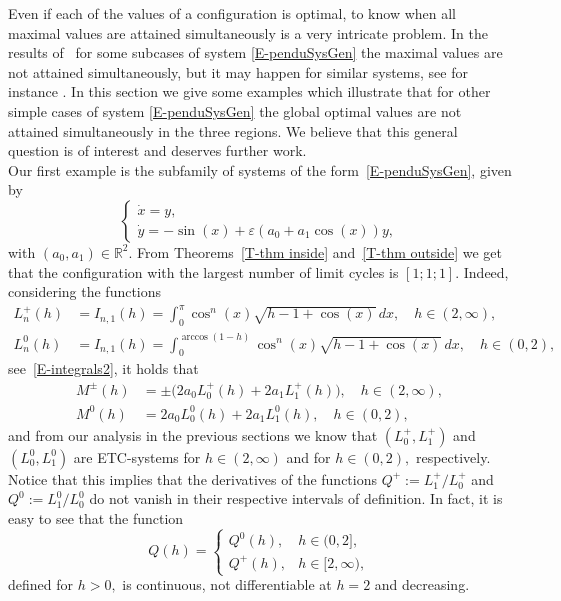 \documentclass[12pt,psamsfonts]{amsart}
\begin{document}
Even if each of the values of a configuration is optimal, to know when all maximal values are
attained simultaneously is a very intricate problem. In the results
of~\cite{Morozov1989,Sanders1986} for some subcases of system \eqref{E-penduSysGen} the maximal
values are not attained simultaneously, but it  may happen for similar systems, see for instance
\cite{Gar}. In this section we give some examples which illustrate that for other simple cases of
system \eqref{E-penduSysGen} the global optimal values are not attained simultaneously in the
three regions.
 We believe that this
general question is of interest and deserves further work.\\

Our first example is  the subfamily of systems of the form~\eqref{E-penduSysGen}, given by
\begin{equation}
      \label{E-ex1}
           {
  \left\{\!
   \begin{array}{l}
    \dot x={y,} \\[2pt] \dot y={-\sin( x)+ {\varepsilon} (a_0+a_1\cos(x))y,}
   \end{array}
  \right.
}
     \end{equation}
with $(a_0,a_1)\in{\mathbb{R}}^2.$ From Theorems~\ref{T-thm inside} and~\ref{T-thm outside} we get that the configuration with the largest
number of limit cycles is $[1;1;1]$. Indeed, considering the functions
\begin{align*}
L_n^+(h)&=I_{n,1}(h)= \int_0^\pi \cos^n(x)\sqrt{h-1+\cos(x)}\,dx, \quad h\in(2,\infty),\\
L_n^0(h)&=I_{n,1}(h)= \int_0^{\arccos(1-h)} \cos^n(x)\sqrt{h-1+\cos(x)}\,dx, \quad h\in(0,2),
\end{align*}
see~\eqref{E-integrals2}, it holds that
\begin{align*}
M^{\pm} (h)&= \pm\big(2 a_0 L_0^+(h)+2a_1 L_1^+(h)\big),\quad h\in(2,\infty),\\
  M^{0} (h)&= 2 a_0 L_0^0(h)+2a_1 L_1^0(h),\quad h\in(0,2),
  \end{align*}
and from our analysis in the previous sections we know that $(L_0^+,L_1^+)$ and $(L_0^0, L_1^0)$
are ETC-systems for $h\in(2,\infty)$ and for $h\in(0,2),$ respectively. Notice that this implies
that the derivatives of the functions $Q^+:=L_1^+/L_0^+$ and $Q^0:=L_1^0/L_0^0$
do not vanish in their respective intervals of definition. In fact, it is easy to see that the
function
\[
Q(h)=\begin{cases} Q^0(h), & h\in(0,2],\\
                   Q^+(h), & h\in[2,\infty),\end{cases}
\]
defined for $h>0,$ is continuous, not differentiable at $h=2$ and decreasing.
\end{document}
